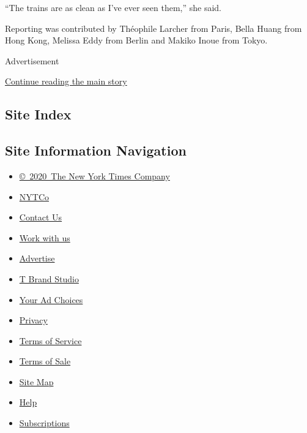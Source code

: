 ``The trains are as clean as I've ever seen them,'' she said.

Reporting was contributed by Théophile Larcher from Paris, Bella Huang
from Hong Kong, Melissa Eddy from Berlin and Makiko Inoue from Tokyo.

Advertisement

\protect\hyperlink{after-bottom}{Continue reading the main story}

\hypertarget{site-index}{%
\subsection{Site Index}\label{site-index}}

\hypertarget{site-information-navigation}{%
\subsection{Site Information
Navigation}\label{site-information-navigation}}

\begin{itemize}
\tightlist
\item
  \href{https://help.nytimes.com/hc/en-us/articles/115014792127-Copyright-notice}{©~2020~The
  New York Times Company}
\end{itemize}

\begin{itemize}
\tightlist
\item
  \href{https://www.nytco.com/}{NYTCo}
\item
  \href{https://help.nytimes.com/hc/en-us/articles/115015385887-Contact-Us}{Contact
  Us}
\item
  \href{https://www.nytco.com/careers/}{Work with us}
\item
  \href{https://nytmediakit.com/}{Advertise}
\item
  \href{http://www.tbrandstudio.com/}{T Brand Studio}
\item
  \href{https://www.nytimes.com/privacy/cookie-policy\#how-do-i-manage-trackers}{Your
  Ad Choices}
\item
  \href{https://www.nytimes.com/privacy}{Privacy}
\item
  \href{https://help.nytimes.com/hc/en-us/articles/115014893428-Terms-of-service}{Terms
  of Service}
\item
  \href{https://help.nytimes.com/hc/en-us/articles/115014893968-Terms-of-sale}{Terms
  of Sale}
\item
  \href{https://spiderbites.nytimes.com}{Site Map}
\item
  \href{https://help.nytimes.com/hc/en-us}{Help}
\item
  \href{https://www.nytimes.com/subscription?campaignId=37WXW}{Subscriptions}
\end{itemize}
